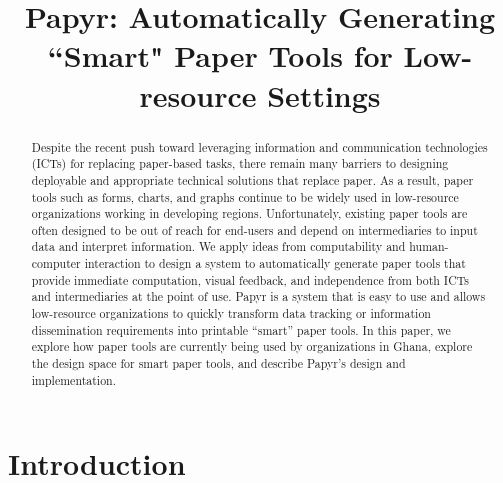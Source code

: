 \documentclass{sig-alternate}
\begin{document}
\newcommand{\nifty}{\textsf{Papyr}\xspace}

\title{Papyr: Automatically Generating ``Smart" Paper Tools for Low-resource Settings}
\author{}
\maketitle

\begin{abstract}
Despite the recent push toward leveraging information and communication technologies (ICTs) for replacing paper-based tasks, there remain many barriers to designing deployable and appropriate technical solutions that replace paper.
As a result, paper tools such as forms, charts, and graphs continue to be widely used in low-resource organizations working in developing regions.
Unfortunately, existing paper tools are often designed to be out of reach for end-users and depend on intermediaries to input data and interpret information. 
We apply ideas from computability and human-computer interaction to design a system to automatically generate paper tools that provide immediate computation, visual feedback, and independence from both ICTs and intermediaries at the point of use. 
\nifty is a system that is easy to use and allows low-resource organizations to quickly transform data tracking or information dissemination requirements into printable ``smart'' paper tools. 
In this paper, we explore how paper tools are currently being used by organizations in Ghana, explore the design space for smart paper tools, and describe \nifty's design and implementation.

\end{abstract}



\section{Introduction}
\end{document}
